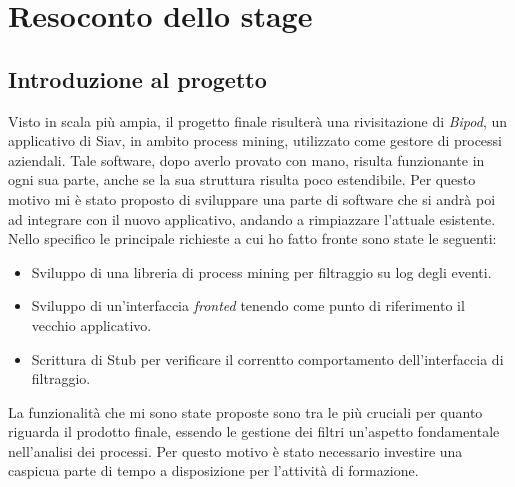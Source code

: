 
\chapter{Resoconto dello stage}
\label{cap:descrizione-stage}

\section{Introduzione al progetto}
Visto in scala più ampia, il progetto finale risulterà una rivisitazione di \textit{Bipod}, un applicativo di Siav, in ambito process mining, utilizzato come gestore di processi aziendali.
Tale software, dopo averlo provato con mano, risulta funzionante in ogni sua parte, anche se la sua struttura risulta poco estendibile. Per questo motivo mi è stato proposto di sviluppare una parte di software che si andrà poi ad integrare con il nuovo applicativo, andando a rimpiazzare l'attuale esistente.
Nello specifico le principale richieste a cui ho fatto fronte sono state le seguenti:
\begin{itemize}
	\item Sviluppo di una libreria di process mining per filtraggio su log degli eventi.
	\item Sviluppo di un'interfaccia \textit{fronted} tenendo come punto di riferimento il vecchio applicativo.
	\item Scrittura di Stub per verificare il correntto comportamento dell'interfaccia di filtraggio.
\end{itemize}
La funzionalità che mi sono state proposte sono tra le più cruciali per quanto riguarda il prodotto finale, essendo le gestione dei filtri un'aspetto fondamentale nell'analisi dei processi. Per questo motivo è stato necessario investire una caspicua parte di tempo a disposizione per l'attività di formazione.
